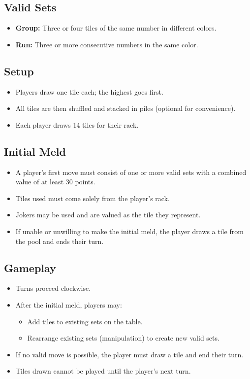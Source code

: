 \documentclass[11pt,letterpaper]{article}
\begin{document}
\subsection*{Valid Sets}
\begin{itemize}
    \item \textbf{Group:} Three or four tiles of the same number in different colors.
    \item \textbf{Run:} Three or more consecutive numbers in the same color.
\end{itemize}

\subsection*{Setup}
\begin{itemize}
    \item Players draw one tile each; the highest goes first.
    \item All tiles are then shuffled and stacked in piles (optional for convenience).
    \item Each player draws 14 tiles for their rack.
\end{itemize}

\subsection*{Initial Meld}
\begin{itemize}
    \item A player's first move must consist of one or more valid sets with a combined value of at least 30 points.
    \item Tiles used must come solely from the player’s rack.
    \item Jokers may be used and are valued as the tile they represent.
    \item If unable or unwilling to make the initial meld, the player draws a tile from the pool and ends their turn.
\end{itemize}

\subsection*{Gameplay}
\begin{itemize}
    \item Turns proceed clockwise.
    \item After the initial meld, players may:
    \begin{itemize}
        \item Add tiles to existing sets on the table.
        \item Rearrange existing sets (manipulation) to create new valid sets.
    \end{itemize}
    \item If no valid move is possible, the player must draw a tile and end their turn.
    \item Tiles drawn cannot be played until the player's next turn.
\end{itemize}
\end{document}
